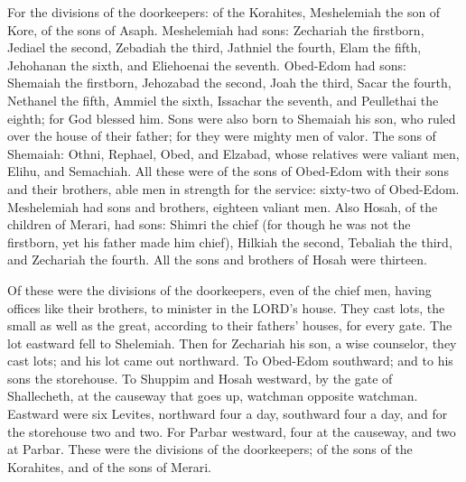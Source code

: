 \mychapter{} \myverse*{}For the divisions of the doorkeepers: of the Korahites, Meshelemiah
the son of Kore, of the sons of Asaph.
\myverse{}Meshelemiah had sons: Zechariah the firstborn, Jediael the second, Zebadiah
the third, Jathniel the fourth,
\myverse{}Elam the fifth, Jehohanan the sixth, and Eliehoenai the seventh.
\myverse{}Obed-Edom had sons: Shemaiah the firstborn, Jehozabad the second, Joah the
third, Sacar the fourth, Nethanel the fifth,
\myverse{}Ammiel the sixth, Issachar the seventh, and Peullethai the eighth; for God
blessed him.
\myverse{}Sons were also born to Shemaiah his son, who ruled over the house of their
father; for they were mighty men of valor.
\myverse{}The sons of Shemaiah: Othni, Rephael, Obed, and Elzabad, whose relatives were
valiant men, Elihu, and Semachiah.
\myverse{}All these were of the sons of Obed-Edom with their sons and their brothers,
able men in strength for the service: sixty-two of Obed-Edom.
\myverse{}Meshelemiah had sons and brothers, eighteen valiant men.
\myverse{}Also Hosah, of the children of Merari, had sons: Shimri the chief (for though
he was not the firstborn, yet his father made him chief),
\myverse{}Hilkiah the second, Tebaliah the third, and Zechariah the fourth. All the
sons and brothers of Hosah were thirteen.

\myverse{}Of these were the divisions of the doorkeepers, even of the
chief men, having offices like their brothers, to minister in the LORD’s house.
\myverse{}They cast lots, the small as well as the great, according to their fathers’
houses, for every gate.
\myverse{}The lot eastward fell to Shelemiah. Then for Zechariah his son, a wise counselor,
they cast lots; and his lot came out northward.
\myverse{}To Obed-Edom southward; and to his sons the storehouse.
\myverse{}To Shuppim and Hosah westward, by the gate of Shallecheth, at the causeway
that goes up, watchman opposite watchman.
\myverse{}Eastward were six Levites, northward four a day, southward four a day, and
for the storehouse two and two.
\myverse{}For Parbar westward, four at the causeway, and two at Parbar.
\myverse{}These were the divisions of the doorkeepers; of the sons of the Korahites,
and of the sons of Merari.

